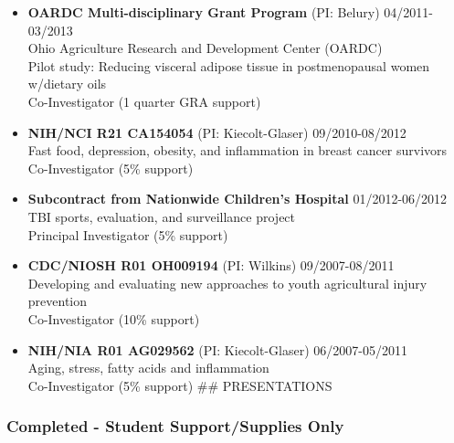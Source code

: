 \documentclass[
  english,
  letterpaper,
  DIV=11,
  numbers=noendperiod]{scrartcl}
\begin{document}
\begin{itemize}
  controlled trial\\
  Co-Investigator (10\% support)
\item
  \textbf{OARDC Multi-disciplinary Grant Program} (PI: Belury)
  {04/2011-03/2013}\\
  Ohio Agriculture Research and Development Center (OARDC)\\
  Pilot study: Reducing visceral adipose tissue in postmenopausal women
  w/dietary oils\\
  Co-Investigator (1 quarter GRA support)
\item
  \textbf{NIH/NCI R21 CA154054} (PI: Kiecolt-Glaser) {09/2010-08/2012}\\
  Fast food, depression, obesity, and inflammation in breast cancer
  survivors\\
  Co-Investigator (5\% support)
\item
  \textbf{Subcontract from Nationwide Children's Hospital}
  {01/2012-06/2012}\\
  TBI sports, evaluation, and surveillance project\\
  Principal Investigator (5\% support)
\item
  \textbf{CDC/NIOSH R01 OH009194} (PI: Wilkins) {09/2007-08/2011}\\
  Developing and evaluating new approaches to youth agricultural injury
  prevention\\
  Co-Investigator (10\% support)
\item
  \textbf{NIH/NIA R01 AG029562} (PI: Kiecolt-Glaser) {06/2007-05/2011}\\
  Aging, stress, fatty acids and inflammation\\
  Co-Investigator (5\% support) \#\# PRESENTATIONS
\end{itemize}

\subsubsection{Completed - Student Support/Supplies
Only}\label{completed---student-supportsupplies-only}
\end{document}
